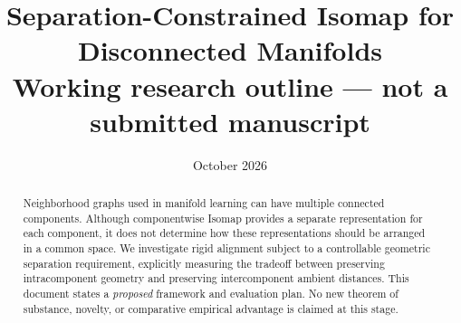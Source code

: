\documentclass[11pt]{article}
\title{Separation-Constrained Isomap for Disconnected Manifolds\\\large Working research outline --- not a submitted manuscript}
\author{}
\date{October 2026}
\begin{document}
\maketitle
\begin{abstract}
Neighborhood graphs used in manifold learning can have multiple connected
components. Although componentwise Isomap provides a separate representation
for each component, it does not determine how these representations should
be arranged in a common space. We investigate rigid alignment subject to a
controllable geometric separation requirement, explicitly measuring the
tradeoff between preserving intracomponent geometry and preserving
intercomponent ambient distances. This document states a \emph{proposed}
framework and evaluation plan. No new theorem of substance, novelty, or
comparative empirical advantage is claimed at this stage.
\end{abstract}





\end{document}
